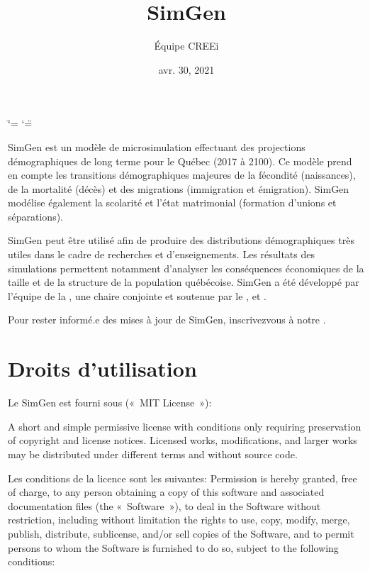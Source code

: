 \documentclass[letterpaper,10pt,french]{sphinxmanual}
\title{SimGen}
\date{avr. 30, 2021}
\author{Équipe CREEi}
\begin{document}
\ifdefined\shorthandoff
  \ifnum\catcode`\=\string=\active\shorthandoff{=}\fi
  \ifnum\catcode`\"=\active{}\fi
\fi

\pagestyle{empty}
\sphinxmaketitle
\pagestyle{plain}
\sphinxtableofcontents
\pagestyle{normal}
\label{\detokenize{index::doc}}


SimGen est un modèle de microsimulation effectuant des projections démographiques de long terme pour le Québec (2017 à 2100).
Ce modèle prend en compte les transitions démographiques majeures de la fécondité (naissances), de la mortalité (décès) et des migrations (immigration et émigration).
SimGen modélise également la scolarité et l’état matrimonial (formation d’unions et séparations).

SimGen peut être utilisé afin de produire des distributions démographiques très utiles dans le cadre de recherches et d’enseignements.
Les résultats des simulations permettent notamment d’analyser les conséquences économiques de la taille et de la structure de la population québécoise.
SimGen a été développé par l’équipe
de la ,
une chaire conjointe  et 
soutenue par le ,  et
.

Pour rester informé.e des mises à jour de SimGen, inscrivez\sphinxhyphen{}vous à notre .


\chapter{Droits d’utilisation}
\label{\detokenize{index:droits-d-utilisation}}
Le SimGen est fourni sous  (« MIT License »):

A short and simple permissive license with conditions only requiring preservation of copyright and license notices. Licensed works, modifications, and larger works may be distributed under different terms and without source code.

Les conditions de la licence sont les suivantes:
Permission is hereby granted, free of charge, to any person obtaining a copy of this software and associated documentation files (the « Software »), to deal in the Software without restriction, including without limitation the rights to use, copy, modify, merge, publish, distribute, sublicense, and/or sell copies of the Software, and to permit persons to whom the Software is furnished to do so, subject to the following conditions:
\end{document}

